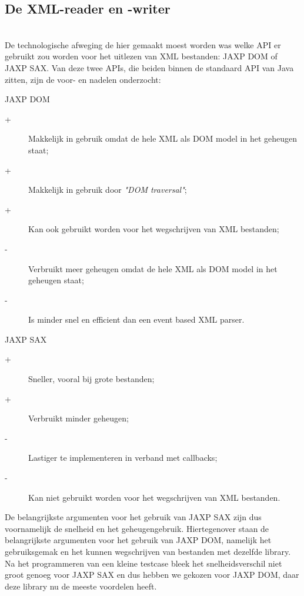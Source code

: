 \documentclass[a4paper,11pt]{article}
\begin{document}
\subsection{De XML-reader en -writer}\mbox{} \\
De technologische afweging de hier gemaakt moest worden was welke API er gebruikt zou worden voor het uitlezen van XML bestanden: JAXP DOM of JAXP SAX. Van deze twee APIs, die beiden binnen de standaard API van Java zitten, zijn de voor- en nadelen onderzocht:
\begin{description}
	\item JAXP DOM
		\begin{description}
			\item[+] Makkelijk in gebruik omdat de hele XML als DOM model in het geheugen staat;
			\item[+] Makkelijk in gebruik door \textit{"DOM traversal"};
			\item[+] Kan ook gebruikt worden voor het wegschrijven van XML bestanden;
			\item[-] Verbruikt meer geheugen omdat de hele XML als DOM model in het geheugen staat;
			\item[-] Is minder snel en efficient dan een event based XML parser.
		\end{description}
	\item JAXP SAX
		\begin{description}
			\item[+] Sneller, vooral bij grote bestanden;
			\item[+] Verbruikt minder geheugen;
			\item[-] Lastiger te implementeren in verband met callbacks;
			\item[-] Kan niet gebruikt worden voor het wegschrijven van XML bestanden.
		\end{description}
\end{description}

De belangrijkste argumenten voor het gebruik van JAXP SAX zijn dus voornamelijk de snelheid en het geheugengebruik. Hiertegenover staan de belangrijkste argumenten voor het gebruik van JAXP DOM, namelijk het gebruiksgemak en het kunnen wegschrijven van bestanden met dezelfde library. Na het programmeren van een kleine testcase bleek het snelheidsverschil niet groot genoeg voor JAXP SAX en dus hebben we gekozen voor JAXP DOM, daar deze library nu de meeste voordelen heeft.
\end{document}
